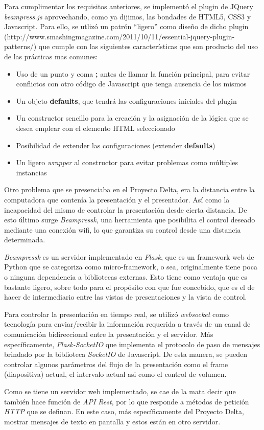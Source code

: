 	Para cumplimentar los requisitos anteriores, se implementó el plugin de JQuery \textit{beampress.js} aprovechando, como ya dijimos, las bondades de HTML5, CSS3 y Javascript. Para ello, se utlizó un patrón ``ligero'' como diseño de dicho plugin (http://www.smashingmagazine.com/2011/10/11/essential-jquery-plugin-patterns/) que cumple con las siguientes características que son producto del uso de las prácticas mas comunes:

	\begin{itemize}
		\item Uso de un punto y coma \textbf{;} antes de llamar la función principal, para evitar conflictos con otro código de Javascript que tenga ausencia de los mismos
		\item Un objeto \textbf{defaults}, que tendrá las configuraciones iniciales del plugin
		\item Un constructor sencillo para la creación y la asignación de la lógica que se desea emplear con el elemento HTML seleccionado
		\item Posibilidad de extender las configuraciones (extender \textbf{defaults})
		\item Un ligero \textit{wrapper} al constructor para evitar problemas como múltiples instancias
	\end{itemize}

	Otro problema que se presenciaba en el Proyecto Delta, era la distancia entre la computadora que contenía la presentación y el presentador. Así como la incapacidad del mismo de controlar la presentación desde cierta distancia. De esto último surge \textit{Beampressk}, una herramienta que posibilita el control deseado mediante una conexión wifi, lo que garantiza su control desde una distancia determinada.

	\textit{Beampressk} es un servidor implementado en \textit{Flask}, que es un framework web de Python que se categoriza como micro-framework, o sea, originalmente tiene poca o ninguna dependencia a bibliotecas externas. Esto tiene como ventaja que es bastante ligero, sobre todo para el propósito con que fue concebido, que es el de hacer de intermediario entre las vistas de presentaciones y la vista de control.

	Para controlar la presentación en tiempo real, se utilizó \textit{websocket} como tecnología para enviar/recibir la información requerida a través de un canal de comunicación bidireccional entre la presentación y el servidor. Más específicamente, \textit{Flask-SocketIO} que implementa el protocolo de paso de mensajes brindado por la biblioteca \textit{SocketIO} de Javascript. De esta manera, se pueden controlar algunos parámetros del flujo de la presentación como el frame (diapositiva) actual, el intervalo actual asi como el control de volumen.

	Como se tiene un servidor web implementado, se cae de la mata decir que también hace función de \textit{API Rest}, por lo que responde a métodos de petición \textit{HTTP} que se definan. En este caso, más específicamente del Proyecto Delta, mostrar mensajes de texto en pantalla y estos están en otro servidor. 




